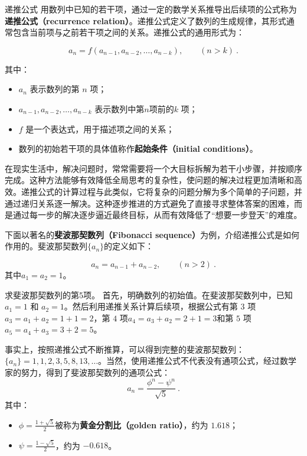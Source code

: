 \begin{definition}{递推公式}
用数列中已知的若干项，通过一定的数学关系推导出后续项的公式称为\textbf{递推公式（recurrence relation）}。递推公式定义了数列的生成规律，其形式通常包含当前项与之前若干项之间的关系。递推公式的通用形式为：

\begin{equation}
a_n = f(a_{n-1}, a_{n-2}, \dots, a_{n-k}),\qquad(n>k)~.
\end{equation}

其中：
\begin{itemize}
\item $a_n$ 表示数列的第 $n$ 项；
\item $a_{n-1}, a_{n-2}, \dots, a_{n-k}$ 表示数列中第$n$项前的$k$ 项；
\item $f$ 是一个表达式，用于描述项之间的关系；
\item 数列的初始若干项的具体值称作\textbf{起始条件（initial conditions）}。
\end{itemize}
\end{definition}

在现实生活中，解决问题时，常常需要将一个大目标拆解为若干小步骤，并按顺序完成。这种方法能够有效降低全局思考的复杂性，使问题的解决过程更加清晰和高效。递推公式的计算过程与此类似，它将复杂的问题分解为多个简单的子问题，并通过递归关系逐一解决。这种逐步推进的方式避免了直接寻求整体答案的困难，而是通过每一步的解决逐步逼近最终目标，从而有效降低了“想要一步登天”的难度。

下面以著名的\textbf{斐波那契数列（Fibonacci sequence）}为例，介绍递推公式是如何作用的。斐波那契数列$\{a_n\}$的定义如下：

\begin{equation}
a_n = a_{n-1} + a_{n-2},\qquad(n>2)~.
\end{equation}
其中$a_1 =  a_2 =1$。

\begin{example}{求斐波那契数列的第5项。}
首先，明确数列的初始值。在斐波那契数列中，已知 $a_1 = 1$ 和 $a_2 = 1$。然后利用递推关系计算后续项，根据公式有第 $3$ 项$a_3 =a_1 +a_2= 1 + 1 = 2$，第 $4$ 项$a_4 = a_3 + a_2 = 2 + 1 = 3$和第 $5$ 项$a_5 = a_4 + a_3 = 3 + 2 = 5$。
\end{example}

事实上，按照递推公式不断推算，可以得到完整的斐波那契数列：$\{a_n\} = 1, 1, 2, 3, 5, 8, 13, \dots$。当然，使用递推公式不代表没有通项公式，经过数学家的努力，得到了斐波那契数列的通项公式：
\begin{equation}
a_n = \frac{\phi^n - \psi^n}{\sqrt{5}}~.
\end{equation}
其中：
\begin{itemize}
\item $\displaystyle\phi = \frac{1+\sqrt{5}}{2}$被称为\textbf{黄金分割比（golden ratio）}，约为 $1.618$；
\item $\displaystyle\psi = \frac{1-\sqrt{5}}{2}$，约为 $-0.618$。
\end{itemize}

